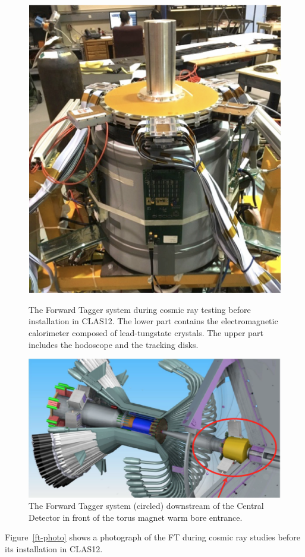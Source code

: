 \documentclass[final,3p,twocolumn]{elsarticle}
\begin{document}
\begin{figure}[t!]
\centerline{\includegraphics[width=0.70\columnwidth]{FT-photo.png}}
\caption{The Forward Tagger system during cosmic ray testing before installation in CLAS12. The lower part contains
the electromagnetic calorimeter composed of lead-tungstate crystals. The upper part includes the hodoscope and the
tracking disks.}
\label{ft-photo}
\vspace{1cm}\centerline{\includegraphics[width=1.0\columnwidth]{CD-FT.png}}
\caption{The Forward Tagger system (circled) downstream of the Central Detector in front of the torus magnet
  warm bore entrance.}
\label{ft}
\end{figure}
Figure~\ref{ft-photo} shows a photograph of the FT during cosmic ray studies before its installation in CLAS12.
\end{document}
